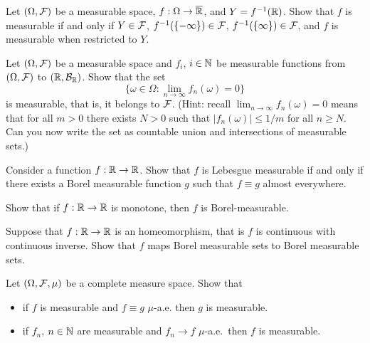 \begin{problem}
    Let $(\Omega,\mathcal F)$ be a measurable space, $f:\Omega\to \overline{\mathbb R}$, and $Y = f^{-1}(\mathbb R)$. Show that $f$ is measurable if and only if $Y\in \mathcal F$, $f^{-1}(\{-\infty\})\in\mathcal F$, $f^{-1}(\{\infty\})\in \mathcal F$, and $f$ is measurable when restricted to $Y$.  
\end{problem}

\begin{problem}
    Let $(\Omega,\mathcal F)$ be a measurable space and $f_i$, $i\in \mathbb N$ be measurable functions from $(\Omega,\mathcal F)$ to $(\mathbb R,\mathcal B_{\mathbb R})$. Show that the set 
    \begin{equation*}
        \{\omega\in \Omega: \lim_{n\to \infty} f_n(\omega) = 0\}
    \end{equation*}
    is measurable, that is, it belongs to $\mathcal F$.
    (Hint: recall $\lim_{n\to \infty} f_n(\omega) = 0$ means that for all $m>0$ there exists $N>0$ such that $|f_n(\omega)|\leq 1/m$ for all $n\geq N$. Can you now write the set as countable union and intersections of measurable sets.)
\end{problem}

\begin{problem} Consider a function $f:\mathbb R\to \mathbb R$. Show that $f$ is Lebesgue measurable if and only if there exists a Borel measurable function $g$ such that $f\equiv g$ almost everywhere.
\end{problem}

\begin{problem} Show that if $f:\mathbb R\to\mathbb R$ is monotone, then $f$ is Borel-measurable.
\end{problem}

\begin{problem} Suppose that $f:\mathbb R\to \mathbb R$ is an homeomorphism, that is $f$ is continuous with continuous inverse. Show that $f$ maps Borel measurable sets to Borel measurable sets.   
\end{problem}

\begin{problem} Let $(\Omega,\mathcal F,\mu)$ be a complete measure space. Show that 
\begin{itemize}
    \item if $f$ is measurable and $f\equiv g$ $\mu$-a.e. then $g$ is measurable.
    \item if $f_n$, $n\in \mathbb N$ are measurable and $f_n\to f$ $\mu$-a.e.\ then $f$ is measurable.
\end{itemize}
\end{problem}

